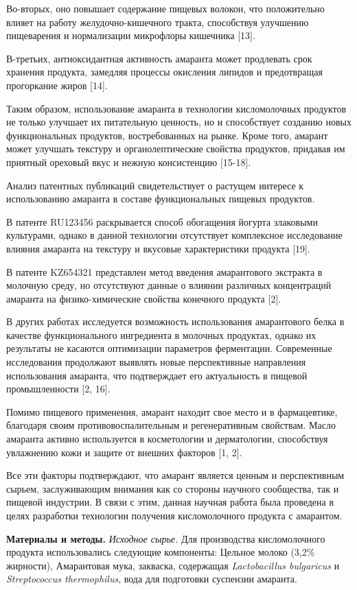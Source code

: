 {Во-вторых, оно повышает содержание пищевых волокон, что положительно
влияет на работу желудочно-кишечного тракта, способствуя улучшению
пищеварения и нормализации микрофлоры кишечника {[}13{]}.

В-третьих, антиоксидантная активность амаранта может продлевать срок
хранения продукта, замедляя процессы окисления липидов и предотвращая
прогоркание жиров {[}14{]}.

Таким образом, использование амаранта в технологии кисломолочных
продуктов не только улучшает их питательную ценность, но и способствует
созданию новых функциональных продуктов, востребованных на рынке. Кроме
того, амарант может улучшать текстуру и органолептические свойства
продуктов, придавая им приятный ореховый вкус и нежную консистенцию
{[}15-18{]}.

Анализ патентных публикаций свидетельствует о растущем интересе к
использованию амаранта в составе функциональных пищевых продуктов.

В патенте RU123456 раскрывается способ обогащения йогурта злаковыми
культурами, однако в данной технологии отсутствует комплексное
исследование влияния амаранта на текстуру и вкусовые характеристики
продукта {[}19{]}.

В патенте KZ654321 представлен метод введения амарантового экстракта в
молочную среду, но отсутствуют данные о влиянии различных концентраций
амаранта на физико-химические свойства конечного продукта {[}2{]}.

В других работах исследуется возможность использования амарантового
белка в качестве функционального ингредиента в молочных продуктах,
однако их результаты не касаются оптимизации параметров ферментации.
Современные исследования продолжают выявлять новые перспективные
направления использования амаранта, что подтверждает его актуальность в
пищевой промышленности {[}2, 16{]}.

Помимо пищевого применения, амарант находит свое место и в фармацевтике,
благодаря своим противовоспалительным и регенеративным свойствам. Масло
амаранта активно используется в косметологии и дерматологии, способствуя
увлажнению кожи и защите от внешних факторов {[}1, 2{]}.

Все эти факторы подтверждают, что амарант является ценным и
перспективным сырьем, заслуживающим внимания как со стороны научного
сообщества, так и пищевой индустрии. В связи с этим, данная научная
работа была проведена в целях разработки технологии получения
кисломолочного продукта с амарантом.

{\bfseries Материалы и методы.} \emph{Исходное сырье.} Для производства
кисломолочного продукта использовались следующие компоненты: Цельное
молоко (3,2\% жирности), Амарантовая мука, закваска, содержащая
\emph{Lactobacillus bulgaricus} и \emph{Streptococcus thermophilus},
вода для подготовки суспензии амаранта.

}
